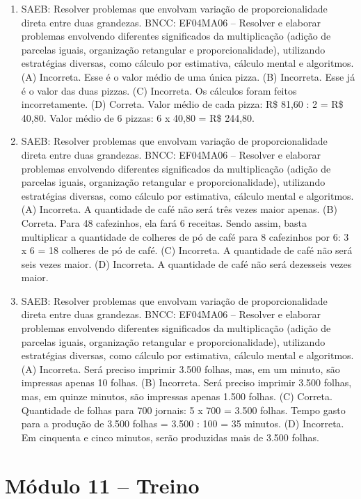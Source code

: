 \begin{enumerate}
\item
SAEB: Resolver problemas que envolvam variação de proporcionalidade direta entre duas grandezas.
BNCC: EF04MA06 -- Resolver e elaborar problemas envolvendo diferentes significados da multiplicação
(adição de parcelas iguais, organização retangular e proporcionalidade), utilizando estratégias
diversas, como cálculo por estimativa, cálculo mental e algoritmos.
(A)  Incorreta. Esse é o valor médio de uma única pizza.
(B)  Incorreta. Esse já é o valor das duas pizzas.
(C)  Incorreta. Os cálculos foram feitos incorretamente.
(D)  Correta.  Valor médio de cada pizza: R\$ 81,60 : 2 = R\$ 40,80. Valor médio de 6 pizzas: 6 x 40,80 = R\$ 244,80.

\item
SAEB: Resolver problemas que envolvam variação de proporcionalidade direta entre duas grandezas.
BNCC: EF04MA06 -- Resolver e elaborar problemas envolvendo diferentes significados da multiplicação
(adição de parcelas iguais, organização retangular e proporcionalidade), utilizando estratégias
diversas, como cálculo por estimativa, cálculo mental e algoritmos.
(A) Incorreta. A quantidade de café não será três vezes maior apenas.
(B) Correta. Para 48 cafezinhos, ela fará 6 receitas. Sendo assim, basta
multiplicar a quantidade de colheres de pó de café para 8 cafezinhos por
6: 3 x 6 = 18 colheres de pó de café.
(C) Incorreta. A quantidade de café não será seis vezes maior.
(D) Incorreta. A quantidade de café não será dezesseis vezes maior.

\item
SAEB: Resolver problemas que envolvam variação de proporcionalidade direta entre duas grandezas.
BNCC: EF04MA06 -- Resolver e elaborar problemas envolvendo diferentes significados da multiplicação
(adição de parcelas iguais, organização retangular e proporcionalidade), utilizando estratégias
diversas, como cálculo por estimativa, cálculo mental e algoritmos.
(A) Incorreta. Será preciso imprimir 3.500 folhas, mas, em um minuto, são impressas apenas 10 folhas.
(B) Incorreta. Será preciso imprimir 3.500 folhas, mas, em quinze minutos, são impressas apenas 1.500 folhas.
(C) Correta. Quantidade de folhas para 700 jornais: 5 x 700 = 3.500 folhas.
Tempo gasto para a produção de 3.500 folhas = 3.500 : 100 = 35 minutos.
(D) Incorreta. Em cinquenta e cinco minutos, serão produzidas mais de 3.500 folhas.
\end{enumerate}

\section*{Módulo 11 – Treino}

